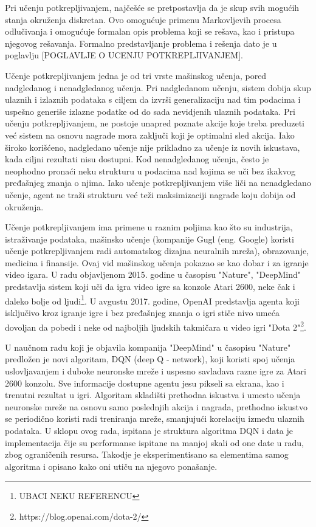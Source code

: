 \documentclass{article}
\begin{document}
Pri učenju potkrepljivanjem, najčešće se pretpostavlja da je skup svih mogućih stanja okruženja diskretan. Ovo omogućuje primenu Markovljevih procesa odlučivanja i omogućuje formalan opis problema koji se rešava, kao i pristupa njegovog rešavanja. Formalno predstavljanje problema i rešenja dato je u poglavlju [POGLAVLJE O UCENJU POTKREPLJIVANJEM].

Učenje potkrepljivanjem jedna je od tri vrste mašinskog učenja, pored nadgledanog i nenadgledanog učenja. Pri nadgledanom učenju, sistem dobija skup ulaznih i izlaznih podataka s ciljem da izvrši generalizaciju nad tim podacima i uspešno generiše izlazne podatke od do sada nevidjenih ulaznih podataka. Pri učenju potkrepljivanjem, ne postoje unapred poznate akcije koje treba preduzeti već sistem na osnovu nagrade mora zaključi koji je optimalni sled akcija. Iako široko korišćeno, nadgledano učenje nije prikladno za učenje iz novih iskustava, kada ciljni rezultati nisu dostupni.  Kod nenadgledanog učenja, često je neophodno pronaći neku strukturu u podacima nad kojima se uči bez ikakvog pređašnjeg znanja o njima. Iako učenje potkrepljivanjem više liči na nenadgledano učenje, agent ne traži strukturu već teži maksimizaciji nagrade koju dobija od okruženja. 

Učenje potkrepljivanjem ima primene u raznim poljima kao što su industrija, istraživanje podataka, mašinsko učenje (kompanije Gugl (eng. Google) koristi učenje potkrepljivanjem radi automatskog dizajna neuralnih mreža), obrazovanje, medicina i finansije. Ovaj vid mašinskog učenja pokazao se kao dobar i za igranje video igara.  U radu objavljenom 2015. godine u časopisu "Nature", "DeepMind" predstavlja sistem koji uči da igra video igre sa konzole Atari 2600, neke čak i daleko bolje od ljudi\footnote{UBACI NEKU REFERENCU}. U avgustu 2017. godine, OpenAI predstavlja agenta koji isključivo kroz igranje igre i bez pređašnjeg znanja o igri stiče nivo umeća dovoljan da pobedi i neke od najboljih ljudskih takmičara u video igri "Dota 2"\footnote{https://blog.openai.com/dota-2/}. 

U naučnom radu koji je objavila kompanija "DeepMind" u časopisu "Nature" predložen je novi algoritam, DQN (deep Q - network), koji koristi spoj učenja uslovljavanjem i duboke neuronske mreže i uspesno savladava razne igre za Atari 2600 konzolu. Sve informacije dostupne agentu jesu pikseli sa ekrana, kao i trenutni rezultat u igri. Algoritam skladišti prethodna iskustva i umesto učenja neuronske mreže na osnovu samo poslednjih akcija i nagrada, prethodno iskustvo se periodično koristi radi treniranja mreže, smanjujući korelaciju između ulaznih podataka. 
U sklopu ovog rada, ispitana je struktura algoritma DQN i data je implementacija čije su performanse ispitane na manjoj skali od one date u radu, zbog ograničenih resursa. Takodje je eksperimentisano sa elementima samog algoritma i opisano kako oni utiču na njegovo ponašanje.
\end{document}
